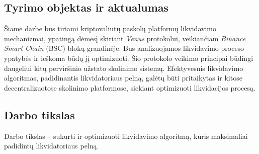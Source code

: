 \documentclass[]{VUMIFTemplateClass}
\begin{document}
\subsection{Tyrimo objektas ir aktualumas}
Šiame darbe bus tiriami kriptovaliutų paskolų platformų likvidavimo mechanizmai, ypatingą dėmesį skiriant \textit{Venus} protokolui, veikiančiam \textit{Binance Smart Chain} (BSC) blokų grandinėje. Bus analizuojamos likvidavimo proceso ypatybės ir ieškoma būdų jį optimizuoti. Šio protokolo veikimo principai būdingi daugeliui kitų perviršinio užstato skolinimo sistemų. Efektyvesnis likvidavimo algoritmas, padidinantis likvidatoriaus pelną, galėtų būti pritaikytas ir kitose decentralizuotose skolinimo platformose, siekiant optimizuoti likvidacijos procesą.

\subsection{Darbo tikslas}
Darbo tikslas – sukurti ir optimizuoti likvidavimo algoritmą, kuris maksimaliai padidintų likvidatoriaus pelną.
\end{document}
